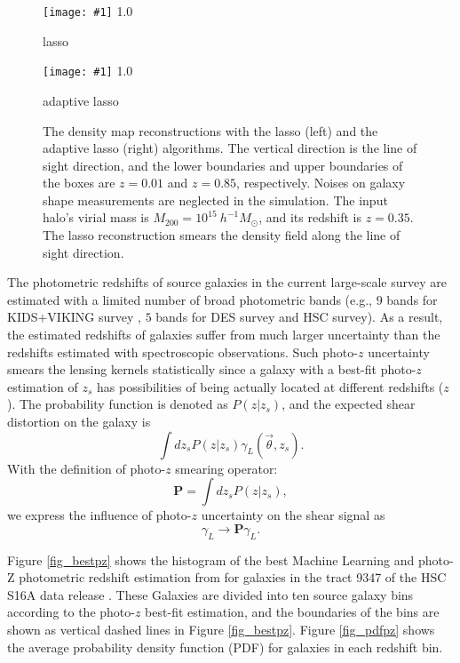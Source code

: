 \documentclass[twocolumn]{aastex63}
\newcommand{\includezraphics}[1]{
    \begin{annotate}{
        \texttt{[image: \#1]}
    }{1.0}
    \arrow { -3., -2}{ -3., 2}
    \note {-3.,2.5}{z}
    \end{annotate}
}
\begin{document}
\begin{figure}
\begin{minipage}[c]{1.0\columnwidth}
    \includezraphics{delta-3-7-pz-nn-lasso.pdf}
    \centering
    \small lasso
\end{minipage}
\begin{minipage}[c]{1.0\columnwidth}
    \includezraphics{delta-3-7-pz-nn-alasso.pdf}
    \centering
    \small adaptive lasso
\end{minipage}
\caption{The density map reconstructions with the lasso (left) and the adaptive
    lasso (right) algorithms. The vertical direction is the line of sight
    direction, and the lower boundaries and upper boundaries of the boxes are
    $z=0.01$ and $z=0.85$, respectively. Noises on galaxy shape measurements
    are neglected in the simulation.  The input halo's virial mass is
    $M_{200}=10^{15} ~h^{-1}M_{\odot}$, and its redshift is $z=0.35$. The lasso
    reconstruction smears the density field along the line of sight direction.
    } \label{fig_lassoVsadaLasso}
\end{figure}

The photometric redshifts of source galaxies in the current large-scale survey
are estimated with a limited number of broad photometric bands (e.g., $9$ bands
for KIDS$+$VIKING survey \citep{KIDS_VIKING-Hildebrant2020}, $5$ bands for DES
survey and HSC survey). As a result, the estimated redshifts of galaxies suffer
from much larger uncertainty than the redshifts estimated with spectroscopic
observations. Such photo-$z$ uncertainty smears the lensing kernels
statistically since a galaxy with a best-fit photo-$z$ estimation of $z_s$ has
possibilities of being actually located at different redshifts ($z$). The
probability function is denoted as $P(z|z_s)$,
and the expected shear distortion on the galaxy is
\begin{equation}\label{eq-delta2gamma-poz}
\int dz_s P(z|z_s) \gamma_L(\vec{\theta},z_s).
\end{equation}
With the definition of photo-$z$ smearing operator:
\begin{equation}
\mathbf{P} = \int dz_s P(z|z_s),
\end{equation}
we express the influence of photo-$z$ uncertainty on the shear signal as
\begin{equation}
\gamma_L \rightarrow \mathbf{P} \gamma_L.
\end{equation}

Figure \ref{fig_bestpz} shows the histogram of the best Machine Learning and
photo-Z \citep[MLZ]{MLZ-TPZ2013} photometric redshift estimation from
\cite{HSC1-photoz} for galaxies in the tract 9347 of the HSC S16A data release
\citep{HSC1-data}. These Galaxies are divided into ten source galaxy bins
according to the photo-$z$ best-fit estimation, and the boundaries of the bins are
shown as vertical dashed lines in Figure \ref{fig_bestpz}. Figure \ref{fig_pdfpz}
shows the average probability density function (PDF) for galaxies in each
redshift bin.
\end{document}
